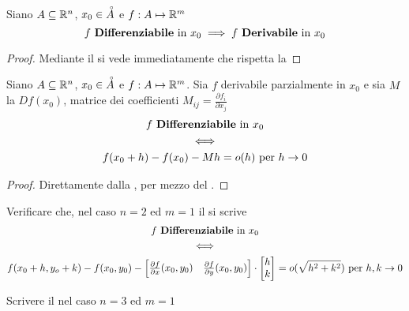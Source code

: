 \begin{corollary}
	Siano $A \subseteq \mathbb{R}^n$, $x_0 \in \accentset{\circ}{A}$ e $f:A \mapsto \mathbb{R}^m$
	\[f \text{ \textbf{Differenziabile} in } x_0 \implies f \text{ \textbf{Derivabile} in } x_0\]
	\begin{proof}
		Mediante il  si vede immediatamente che rispetta la 
	\end{proof}
\end{corollary}
\begin{corollary}
	\label{coro:f_diff_con_matr_comp}
	Siano $A \subseteq \mathbb{R}^n$, $x_0 \in \accentset{\circ}{A}$ e $f:A \mapsto \mathbb{R}^m$. Sia $f$ derivabile parzialmente in $x_0$ e sia $M$ la $Df(x_0)$, matrice dei coefficienti $M_{ij} = \frac{\partial f_i}{\partial x_j}$
	\begin{equation*}
		\begin{gathered}
			f \text{ \textbf{Differenziabile} in } x_0\\
			\iff\\
			f(x_0 + h) - f(x_0) - Mh = o(h) \text{ per } h \to 0
		\end{gathered}
	\end{equation*}
	\begin{proof}
		Direttamente dalla , per mezzo del .
	\end{proof}
\end{corollary}
\begin{exercise}
	Verificare che, nel caso $n = 2$ ed $m = 1$ il  si scrive
	\begin{equation*}
		\begin{gathered}
			f \text{ \textbf{Differenziabile} in } x_0\\
			\iff\\
			f(x_0 + h, y_o + k) - f(x_0, y_0) -
			\begin{bmatrix}
				\frac{\partial f}{\partial x}(x_0, y_0) & \frac{\partial f}{\partial y}(x_0, y_0)
			\end{bmatrix}
			\cdot
			\begin{bmatrix}
				h\\
				k
			\end{bmatrix}
			= o(\sqrt{h^2 + k^2}) \text{ per } h, k \to 0
		\end{gathered}
	\end{equation*}
\end{exercise}
\begin{exercise}
	Scrivere il  nel caso $n = 3$ ed $m = 1$
\end{exercise}

